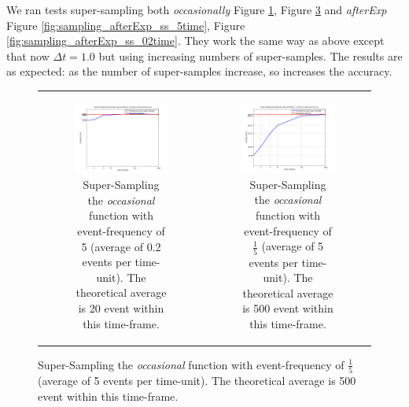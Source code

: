 We ran tests super-sampling both \textit{occasionally} Figure \ref{fig:sampling_occasionally_ss_02evts}, Figure \ref{fig:sampling_occasionally_ss_5evts} and \textit{afterExp} Figure \ref{fig:sampling_afterExp_ss_5time}, Figure \ref{fig:sampling_afterExp_ss_02time}. They work the same way as above except that now $\Delta t = 1.0$ but using increasing numbers of super-samples. The results are as expected: as the number of super-samples increase, so increases the accuracy.

\begin{figure}
\begin{center}
	\begin{tabular}{c c}
		\begin{subfigure}[b]{0.5\textwidth}
			\centering
			\includegraphics[width=.6\textwidth, angle=0]{./shared/fig/sampling/samplingTest_occasionally_ss_02evts.png}
			\caption{Super-Sampling the \textit{occasional} function with event-frequency of 5 (average of 0.2 events per time-unit). The theoretical average is 20 event within this time-frame.}
			\label{fig:sampling_occasionally_ss_02evts}
		\end{subfigure}
		&
		\begin{subfigure}[b]{0.5\textwidth}
			\centering
			\includegraphics[width=.6\textwidth, angle=0]{./shared/fig/sampling/samplingTest_occasionally_ss_5evts.png}
			\caption{Super-Sampling the \textit{occasional} function with event-frequency of $\frac{1}{5}$ (average of 5 events per time-unit). The theoretical average is 500 event within this time-frame.}
			\label{fig:sampling_occasionally_ss_5evts}
		\end{subfigure}


\end{tabular}
\end{center}
\end{figure}
